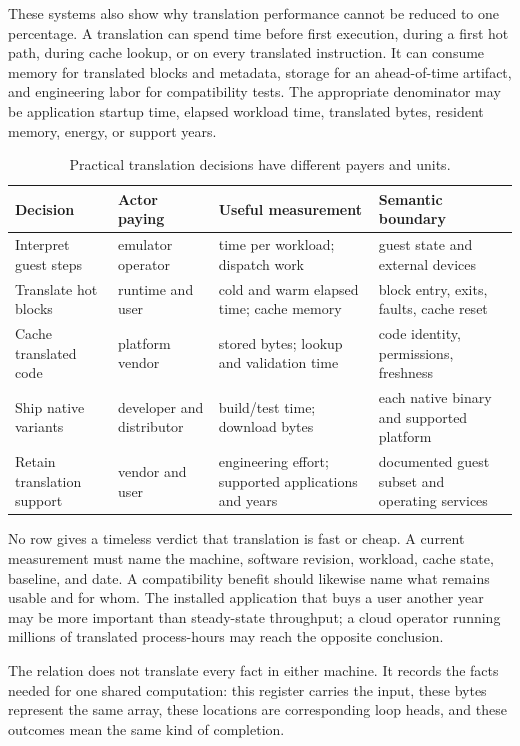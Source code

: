 These systems also show why translation performance cannot be reduced to one
percentage. A translation can spend time before first execution, during a
first hot path, during cache lookup, or on every translated instruction. It
can consume memory for translated blocks and metadata, storage for an
ahead-of-time artifact, and engineering labor for compatibility tests. The
appropriate denominator may be application startup time, elapsed workload
time, translated bytes, resident memory, energy, or support years.

\begin{table}[htbp]
\centering
\caption{Practical translation decisions have different payers and units.}
\begin{tabular}{@{}p{}p{}p{}p{}@{}}
\toprule
Decision & Actor paying & Useful measurement & Semantic boundary \tabularnewline
\midrule
Interpret guest steps & emulator operator & time per workload; dispatch work & guest state and external devices \tabularnewline
Translate hot blocks & runtime and user & cold and warm elapsed time; cache memory & block entry, exits, faults, cache reset \tabularnewline
Cache translated code & platform vendor & stored bytes; lookup and validation time & code identity, permissions, freshness \tabularnewline
Ship native variants & developer and distributor & build/test time; download bytes & each native binary and supported platform \tabularnewline
Retain translation support & vendor and user & engineering effort; supported applications and years & documented guest subset and operating services \tabularnewline
\bottomrule
\end{tabular}
\end{table}

No row gives a timeless verdict that translation is fast or cheap. A current
measurement must name the machine, software revision, workload, cache state,
baseline, and date. A compatibility benefit should likewise name what remains
usable and for whom. The installed application that buys a user another year
may be more important than steady-state throughput; a cloud operator running
millions of translated process-hours may reach the opposite conclusion.

\begin{archive}[title={A relation is a small bilingual dictionary}]
The relation does not translate every fact in either machine. It records the
facts needed for one shared computation: this register carries the input,
these bytes represent the same array, these locations are corresponding loop
heads, and these outcomes mean the same kind of completion.
\end{archive}

